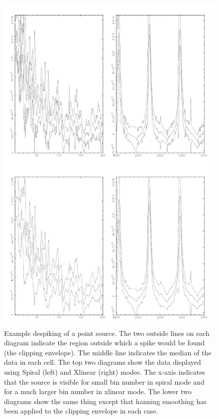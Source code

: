 \documentclass[twoside,11pt]{starlink}
\begin{document}
\begin{figure}
\begin{center}
\includegraphics[width=5in]{sun216_despike_eg}
\caption{Example despiking of a point source. The two outside lines on each
diagram indicate the region outside which a spike would be found (the clipping
envelope). The middle line indicates the median of the data in each cell.  The
top two diagrams show the data displayed using Spiral (left) and Xlinear
(right) modes. The x-axis indicates that the source is visible for small
bin number in spiral mode and for a much larger bin number in xlinear
mode. The lower two diagrams show the same thing except that hanning smoothing
has been applied to the clipping envelope in each case. }
\label{fig:despike_eg}
\end{center}
\end{figure}
\end{document}
